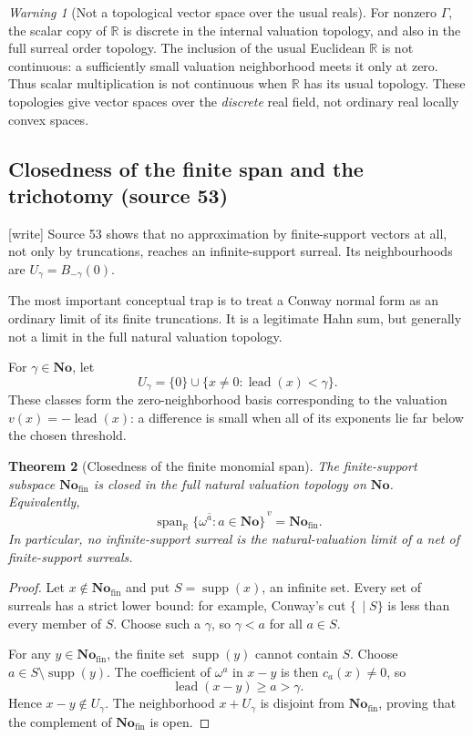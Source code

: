 \documentclass[11pt,letterpaper]{article}
\numberwithin{equation}{section}
\newtheorem{theorem}{Theorem}[section]
\theoremstyle{definition}
\theoremstyle{remark}
\newtheorem{warning}[theorem]{Warning}
\newcommand{\No}{\mathbf{No}}
\newcommand{\R}{\mathbb{R}}
\newcommand{\Fin}{\No_{\mathrm{fin}}}
\newcommand{\supp}{\operatorname{supp}}
\newcommand{\Span}{\operatorname{span}}
\newcommand{\lead}{\operatorname{lead}}
\newcommand{\wtag}{\textup{[write]}}%
\begin{document}
\begin{warning}[Not a topological vector space over the usual reals]
For nonzero $\Gamma$, the scalar copy of $\R$ is discrete in the internal valuation topology, and also in the full surreal order topology. The inclusion of the usual Euclidean $\R$ is not continuous: a sufficiently small valuation neighborhood meets it only at zero. Thus scalar multiplication is not continuous when $\R$ has its usual topology. These topologies give vector spaces over the \emph{discrete} real field, not ordinary real locally convex spaces.
\end{warning}

\subsection{Closedness of the finite span and the trichotomy (source 53)}

\noindent\wtag{} Source 53 shows that no approximation by finite-support
vectors at all, not only by truncations, reaches an infinite-support
surreal.  Its neighbourhoods are \(U_\gamma=B_{-\gamma}(0)\).

The most important conceptual trap is to treat a Conway normal form as an ordinary
limit of its finite truncations. It is a legitimate Hahn sum, but generally not a
limit in the full natural valuation topology.

For $\gamma\in\No$, let
\[
  U_\gamma=\{0\}\cup\{x\ne0:\lead(x)<\gamma\}.
\]
These classes form the zero-neighborhood basis corresponding to the valuation
$v(x)=-\lead(x)$: a difference is small when all of its exponents lie far below
the chosen threshold.

\begin{theorem}[Closedness of the finite monomial span]\label{rvs:cv:thm:finite-span-closed}
The finite-support subspace $\Fin$ is closed in the full natural valuation
topology on $\No$. Equivalently,
\[
  \overline{\Span_{\R}\{\omega^a:a\in\No\}}^{\,v}=\Fin.
\]
In particular, no infinite-support surreal is the natural-valuation limit of a net
of finite-support surreals.
\end{theorem}

\begin{proof}
Let $x\notin\Fin$ and put $S=\supp(x)$, an infinite set. Every set of surreals has
a strict lower bound: for example, Conway's cut $\{\,\mid S\}$ is less than every
member of $S$. Choose such a $\gamma$, so $\gamma<a$ for all $a\in S$.

For any $y\in\Fin$, the finite set $\supp(y)$ cannot contain $S$. Choose
$a\in S\setminus\supp(y)$. The coefficient of $\omega^a$ in $x-y$ is then
$c_a(x)\ne0$, so
\[
  \lead(x-y)\ge a>\gamma.
\]
Hence $x-y\notin U_\gamma$. The neighborhood $x+U_\gamma$ is disjoint from
$\Fin$, proving that the complement of $\Fin$ is open.
\end{proof}
\end{document}

